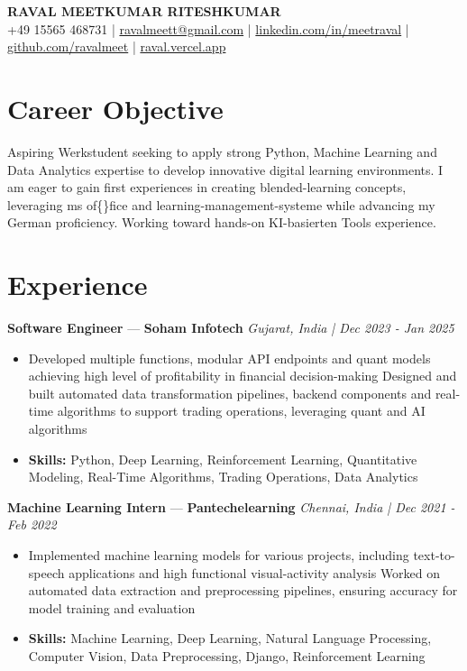 \documentclass[a4paper,10pt]{article}
\begin{document}
\begin{center}
  {\Large\bfseries RAVAL MEETKUMAR RITESHKUMAR}\\[2pt]
  {\small +49 15565 468731 \;|\; \href{mailto:ravalmeett@gmail.com}{ravalmeett@gmail.com} \;|\; \href{https://www.linkedin.com/in/meetraval/}{linkedin.com/in/meetraval} \;|\; \href{https://github.com/ravalmeet}{github.com/ravalmeet} \;|\; \href{https://raval.vercel.app/}{raval.vercel.app}}
\end{center}
\vspace{-3pt}

\section*{Career Objective}
Aspiring Werkstudent seeking to apply strong Python, Machine Learning and Data Analytics expertise to develop innovative digital learning environments. I am eager to gain first experiences in creating blended-learning concepts, leveraging ms of\{\}fice and learning-management-systeme while advancing my German proficiency. Working toward hands-on KI-basierten Tools experience.\par

\section*{Experience}
\textbf{Software Engineer} — \textbf{Soham Infotech} \hfill \textit{Gujarat, India \;|\; Dec 2023 - Jan 2025}\par
\vspace{1pt}
\begin{itemize}
  \item Developed multiple functions, modular API endpoints and quant models achieving high level of profitability in financial decision-making Designed and built automated data transformation pipelines, backend components and real-time algorithms to support trading operations, leveraging quant and AI algorithms
  \item \textbf{Skills:} Python, Deep Learning, Reinforcement Learning, Quantitative Modeling, Real-Time Algorithms, Trading Operations, Data Analytics
\end{itemize}
\vspace{3pt}
\textbf{Machine Learning Intern} — \textbf{Pantechelearning} \hfill \textit{Chennai, India \;|\; Dec 2021 - Feb 2022}\par
\vspace{1pt}
\begin{itemize}
  \item Implemented machine learning models for various projects, including text-to-speech applications and high functional visual-activity analysis Worked on automated data extraction and preprocessing pipelines, ensuring accuracy for model training and evaluation
  \item \textbf{Skills:} Machine Learning, Deep Learning, Natural Language Processing, Computer Vision, Data Preprocessing, Django, Reinforcement Learning
\end{itemize}
\end{document}
